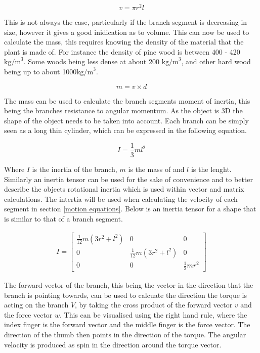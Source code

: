 \begin{equation}
v  = \pi r^2 l
\end{equation}

\noindent
This is not always the case, particularly if the branch segment is decreasing in size, however it gives a good inidication as to volume. This can now be used to calculate the mass, this requires knowing the density of the material that the plant is made of. For instance the density of pine wood is between 400 - 420 $\text{kg/m}^3$. Some woods being less dense at about 200 $\text{kg/m}^3$, and other hard wood being up to about 1000$\text{kg/m}^3$.

\begin{equation}
m = v \times d
\end{equation}

\noindent
The mass can be used to calculate the branch segments moment of inertia, this being the branches resistance to angular momentum. As the object is 3D the shape of the object needs to be taken into account. Each branch can be simply seen as a long thin cylinder, which can be expressed in the following equation.

\begin{equation}
I = \frac{1}{3} m l ^ 2
\end{equation}

\noindent
Where $I$ is the inertia of the branch, $m$ is the mass of and $l$ is the lenght. Similarly an inertia tensor can be used for the sake of convenience and to better describe the objects rotational inertia which is used within vector and matrix calculations. The intertia will be used when calculating the velocity of each segment in section \ref{motion equations}. Below is an inertia tensor for a shape that is similar to that of a branch segment.

\begin{equation}
\begin{aligned}
I = \begin{bmatrix}
\frac{1}{12}m(3r^2 + l^2) 	& 0 							& 0 \\
0 							& \frac{1}{12}m(3r^2 + l^2)		& 0 \\
0 							& 0 							& \frac{1}{2}mr^2 
\end{bmatrix}
\end{aligned}
\end{equation}

\noindent
The forward vector of the branch, this being the vector in the direction that the branch is pointing towards, can be used to calcuate the direction the torque is acting on the branch $V$, by taking the cross product of the forward vector $v$ and the force vector $w$. This can be visualised using the right hand rule, where the index finger is the forward vector and the middle finger is the force vector. The direction of the thumb then points in the direction of the torque. The angular velocity is produced as spin in the direction around the torque vector.

